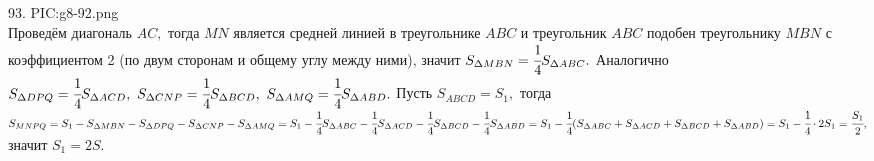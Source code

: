 93. {{PIC:g8-92.png}}\\
Проведём диагональ $AC,$ тогда $MN$ является средней линией в треугольнике $ABC$ и треугольник $ABC$ подобен треугольнику $MBN$ с коэффициентом 2 (по двум сторонам и общему углу между ними), значит $S_{\Delta MBN}=\cfrac{1}{4}S_{\Delta ABC}.$ Аналогично $S_{\Delta DPQ}=\cfrac{1}{4}S_{\Delta ACD},\  S_{\Delta CNP}=\cfrac{1}{4}S_{\Delta BCD},\ S_{\Delta AMQ}=\cfrac{1}{4}S_{\Delta ABD}.$ Пусть $S_{ABCD}=S_1,$ тогда $S_{MNPQ}=S_1-S_{\Delta MBN}-S_{\Delta DPQ}-S_{\Delta CNP}-S_{\Delta AMQ}=
S_1-\cfrac{1}{4}S_{\Delta ABC}-\cfrac{1}{4}S_{\Delta ACD}-\cfrac{1}{4}S_{\Delta BCD}-\cfrac{1}{4}S_{\Delta ABD}=S_1-\cfrac{1}{4}(S_{\Delta ABC}+S_{\Delta ACD}+
S_{\Delta BCD}+S_{\Delta ABD})=S_1-\cfrac{1}{4}\cdot2S_1=\cfrac{S_1}{2},$ значит $S_1=2S.$\\
